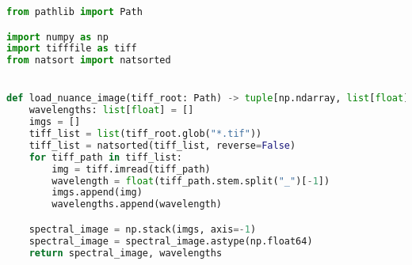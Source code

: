 \begin{lstlisting}[language=python, caption=Load Nuance Cmaera, label={code:load-nuance}]
from pathlib import Path

import numpy as np
import tifffile as tiff
from natsort import natsorted


def load_nuance_image(tiff_root: Path) -> tuple[np.ndarray, list[float]]:
    wavelengths: list[float] = []
    imgs = []
    tiff_list = list(tiff_root.glob("*.tif"))
    tiff_list = natsorted(tiff_list, reverse=False)
    for tiff_path in tiff_list:
        img = tiff.imread(tiff_path)
        wavelength = float(tiff_path.stem.split("_")[-1])
        imgs.append(img)
        wavelengths.append(wavelength)

    spectral_image = np.stack(imgs, axis=-1)
    spectral_image = spectral_image.astype(np.float64)
    return spectral_image, wavelengths

\end{lstlisting}